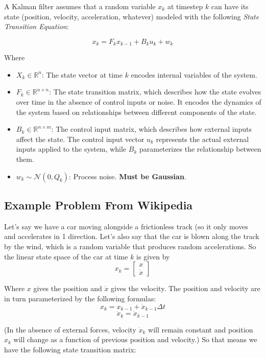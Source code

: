 \documentclass[12pt]{article}
\begin{document}
A Kalman filter assumes that a random variable \(x_k\) at timestep \(k\) can have its state (position, velocity, acceleration, whatever) modeled with the following \emph{State Transition Equation}:

\[x_k = F_kx_{k-1} + B_ku_k + w_k\]

Where
\begin{itemize}
\item \textbf{\(X_k \in \mathbb{R}^n\)}: The state vector at time \(k\) encodes internal variables of the system.
\item \textbf{\(F_k \in \mathbb{R}^{n \times n}\)}: The state transition matrix, which describes how the state evolves over time in the absence of control inputs or noise. It encodes the dynamics of the system based on relationships between different components of the state.
\item \textbf{\(B_k \in \mathbb{R}^{n \times m}\)}: The control input matrix, which describes how external inputs affect the state. The control input vector \(u_k\) represents the actual external inputs applied to the system, while \(B_k\) parameterizes the relationship between them.
\item \textbf{\(w_k \sim \mathcal{N}(0, Q_k)\)}: Process noise. \textbf{Must be Gaussian}.
\end{itemize}
\subsection{Example Problem From Wikipedia}
Let's say we have a car moving alongside a frictionless track (so it only moves and accelerates in 1 direction. Let's also say that the car is blown along the track by the wind, which is a random variable that produces random accelerations. So the linear state space of the car at time \(k\) is given by 
\[
x_k = \begin{bmatrix}
x  \\
\dot{x}
\end{bmatrix}
\]

Where \(x\) gives the position and \(\dot{x}\) gives the velocity. The position and velocity are in turn parameterized by the following formulas:
\[x_k = x_{k-1} + \dot{x}_{k-1}\Delta t\]
\[\dot{x}_k = \dot{x}_{k-1}\]

(In the absence of external forces, velocity \(\dot{x}_k\) will remain constant and position \(x_k\) will change as a function of previous position and velocity.) So that means we have the following state transition matrix:
\end{document}

